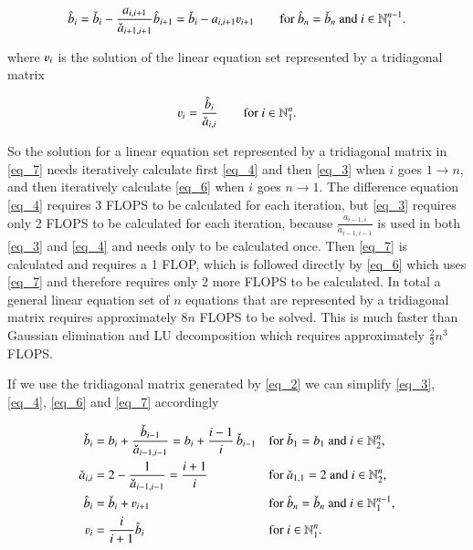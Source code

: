 \documentclass[11pt,english,a4paper]{article}
\begin{document}
\begin{flushleft}
\begin{align}
\hat b_i = \check b_i - \frac{a_{i,i+1}}{\check a_{i+1,i+1}} \hat b_{i+1} = \check b_i - a_{i,i+1} \varv_{i+1} \qquad \text{for $\hat b_n = \check b_n$ and $i\in\mathbb{N}_1^{n-1}$.}
\label{eq_6}
\end{align}

where $\varv_i$ is the solution of the linear equation set represented by a tridiagonal matrix

\begin{align}
\varv_i = \frac{\hat b_i}{\check a_{i,i}} \qquad \text{for $i\in\mathbb{N}_1^n$.}
\label{eq_7}
\end{align}

So the solution for a linear equation set represented by a tridiagonal matrix in \eqref{eq_7} needs iteratively calculate first \eqref{eq_4} and then \eqref{eq_3} when $i$ goes $1\to n$, and then iteratively calculate \eqref{eq_6} when $i$ goes $n\to 1$. The difference equation \eqref{eq_4} requires 3 FLOPS to be calculated for each iteration, but \eqref{eq_3} requires only 2 FLOPS to be calculated for each iteration, because $\frac{a_{i-1,i}}{\check a_{i-1,i-1}}$ is used in both \eqref{eq_3} and \eqref{eq_4} and needs only to be calculated once. Then \eqref{eq_7} is calculated and requires a 1 FLOP, which is followed directly by \eqref{eq_6} which uses \eqref{eq_7} and therefore requires only 2 more FLOPS to be calculated. In total a general linear equation set of $n$ equations that are represented by a tridiagonal matrix requires approximately $8n$ FLOPS to be solved. This is much faster than Gaussian elimination and LU decomposition which requires approximately $\frac{2}{3}n^3$ FLOPS. \linebreak

If we use the tridiagonal matrix generated by \eqref{eq_2} we can simplify \eqref{eq_3}, \eqref{eq_4}, \eqref{eq_6} and \eqref{eq_7} accordingly

\begin{align}
\check b_i &= b_i + \frac{\check b_{i-1}}{\check a_{i-1,i-1}} = b_i + \frac{i-1}{i} \, \check b_{i-1} && \text{for $\check b_1 = b_1$ and $i\in\mathbb{N}_2^n$,} 
\label{eq_8}
\\
\check a_{i,i} &= 2 - \frac{1}{\check a_{i-1,i-1}} = \frac{i+1}{i} && \text{for $\check a_{1,1} = 2$ and $i\in\mathbb{N}_2^n$,}
\label{eq_9}
\\
\hat b_i &= \check b_i + \varv_{i+1} && \text{for $\hat b_n = \check b_n$ and $i\in \mathbb{N}_1^{n-1}$,}
\label{eq_10}
\\
\varv_i &= \frac{i}{i+1}\hat b_i && \text{for $i \in \mathbb{N}_1^n$.}
\label{eq_11}
\end{align}


\end{flushleft}
\end{document}
